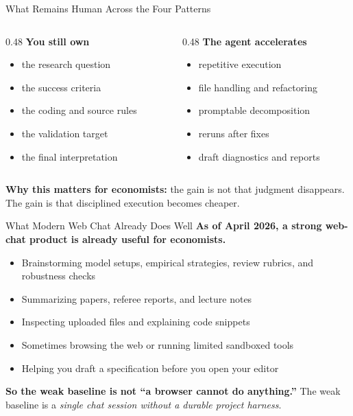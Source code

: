 \documentclass[10pt,english,aspectratio=169]{beamer}
\begin{document}
\begin{frame}{What Remains Human Across the Four Patterns}
\begin{columns}[T]
\begin{column}{0.48\textwidth}
\textbf{You still own}
\begin{itemize}
    \item the research question
    \item the success criteria
    \item the coding and source rules
    \item the validation target
    \item the final interpretation
\end{itemize}
\end{column}
\begin{column}{0.48\textwidth}
\textbf{The agent accelerates}
\begin{itemize}
    \item repetitive execution
    \item file handling and refactoring
    \item promptable decomposition
    \item reruns after fixes
    \item draft diagnostics and reports
\end{itemize}
\end{column}
\end{columns}

\vspace{0.3cm}
\textbf{Why this matters for economists:} the gain is not that judgment disappears. The gain is that disciplined execution becomes cheaper.
\end{frame}

\begin{frame}{What Modern Web Chat Already Does Well}
\textbf{As of April 2026, a strong web-chat product is already useful for economists.}

\vspace{0.25cm}

\begin{itemize}
    \item Brainstorming model setups, empirical strategies, review rubrics, and robustness checks
    \item Summarizing papers, referee reports, and lecture notes
    \item Inspecting uploaded files and explaining code snippets
    \item Sometimes browsing the web or running limited sandboxed tools
    \item Helping you draft a specification before you open your editor
\end{itemize}

\vspace{0.3cm}

\textbf{So the weak baseline is not ``a browser cannot do anything.''} The weak baseline is a \textit{single chat session without a durable project harness}.
\end{frame}
\end{document}
